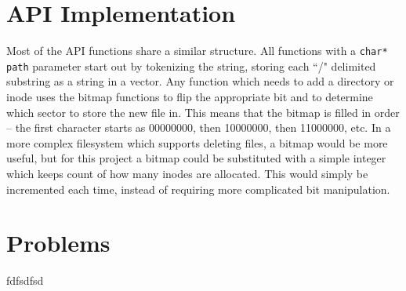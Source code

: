 \documentclass[]{article}
\begin{document}


\section{API Implementation}
Most of the API functions share a similar structure. All functions with a \texttt{char* path} parameter start out by tokenizing the string, storing each ``/" delimited substring as a string in a vector. Any function which needs to add a directory or inode uses the bitmap functions to flip the appropriate bit and to determine which sector to store the new file in. This means that the bitmap is filled in order -- the first character starts as 00000000, then 10000000, then 11000000, etc. In a more complex filesystem which supports deleting files, a bitmap would be more useful, but for this project a bitmap could be substituted with a simple integer which keeps count of how many inodes are allocated. This would simply be incremented each time, instead of requiring more complicated bit manipulation.

\section{Problems} \label{sec:problems}
fdfsdfsd
\end{document}
